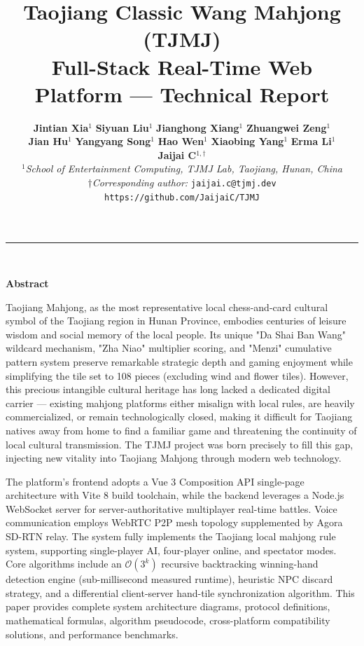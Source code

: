 \documentclass[11pt,a4paper]{article}
\title{\bfseries\LARGE\color{blue!60!black} Taojiang Classic Wang Mahjong (TJMJ)\\[4pt]
       \large\color{blue!50!black} Full-Stack Real-Time Web Platform — Technical Report}
\author{%
  \begin{tabular}{c}
  \small\textbf{Jintian Xia}$^{1}$ \quad \textbf{Siyuan Liu}$^{1}$ \quad \textbf{Jianghong Xiang}$^{1}$ \quad \textbf{Zhuangwei Zeng}$^{1}$ \\
  \small\textbf{Jian Hu}$^{1}$ \quad \textbf{Yangyang Song}$^{1}$ \quad \textbf{Hao Wen}$^{1}$ \quad \textbf{Xiaobing Yang}$^{1}$ \quad \textbf{Erma Li}$^{1}$ \\[4pt]
  \small\textbf{Jaijai C}$^{1,\dagger}$ \\[2pt]
  \small$^{1}$\textit{School of Entertainment Computing, TJMJ Lab, Taojiang, Hunan, China} \\
  \small$\dagger$\textit{Corresponding author: }\texttt{jaijai.c@tjmj.dev} \\[2pt]
  \small\texttt{\color{blue}https://github.com/JaijaiC/TJMJ}
  \end{tabular}
}
\date{}
\begin{document}
\maketitle


\vspace{-8pt}
\begin{center}
{\color{cyan!60!black}\rule{\linewidth}{1.5pt}}\\[2pt]
\begin{minipage}{0.95\linewidth}
{\centering\small\textbf{\color{orange!80!black}Abstract}\par}
\vspace{4pt}
\color{black!80}\setlength{\parindent}{2em}
Taojiang Mahjong, as the most representative local chess-and-card cultural symbol of the Taojiang region in Hunan Province, embodies centuries of leisure wisdom and social memory of the local people. Its unique "Da Shai Ban Wang" wildcard mechanism, "Zha Niao" multiplier scoring, and "Menzi" cumulative pattern system preserve remarkable strategic depth and gaming enjoyment while simplifying the tile set to 108 pieces (excluding wind and flower tiles). However, this precious intangible cultural heritage has long lacked a dedicated digital carrier — existing mahjong platforms either misalign with local rules, are heavily commercialized, or remain technologically closed, making it difficult for Taojiang natives away from home to find a familiar game and threatening the continuity of local cultural transmission. The TJMJ project was born precisely to fill this gap, injecting new vitality into Taojiang Mahjong through modern web technology.

The platform's frontend adopts a Vue 3 Composition API single-page architecture with Vite 8 build toolchain, while the backend leverages a Node.js WebSocket server for server-authoritative multiplayer real-time battles. Voice communication employs WebRTC P2P mesh topology supplemented by Agora SD-RTN relay. The system fully implements the Taojiang local mahjong rule system, supporting single-player AI, four-player online, and spectator modes. Core algorithms include an $\mathcal{O}(3^k)$ recursive backtracking winning-hand detection engine (sub-millisecond measured runtime), heuristic NPC discard strategy, and a differential client-server hand-tile synchronization algorithm. This paper provides complete system architecture diagrams, protocol definitions, mathematical formulas, algorithm pseudocode, cross-platform compatibility solutions, and performance benchmarks.


\end{minipage}
\end{center}
\end{document}
